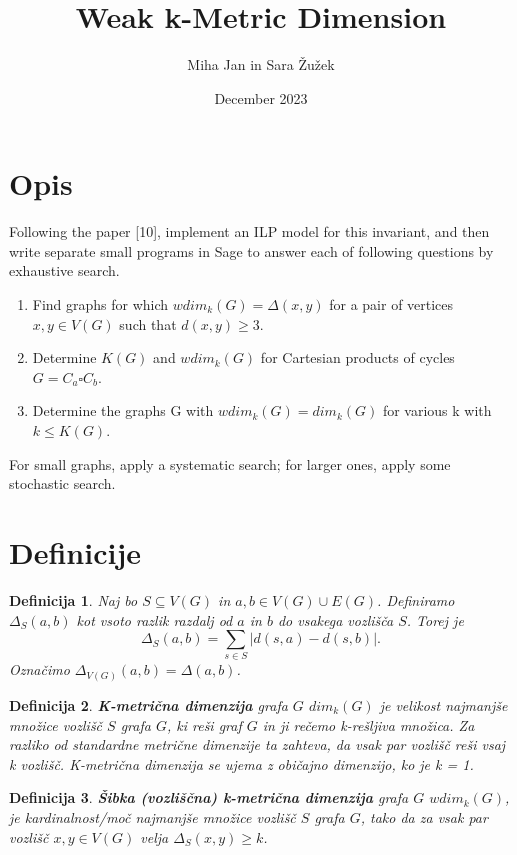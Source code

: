 \documentclass[a4paper,12pt]{article}
\newtheorem{definition}{Definicija}
\begin{document}
\author{Miha Jan in Sara Žužek}
\date{December 2023}
\title{Weak k-Metric Dimension}
\maketitle

\section{Opis}
Following the paper [10], implement an ILP model for this invariant, and then write separate
small programs in Sage to answer each of following questions by exhaustive search.
\begin{enumerate}
    \item Find graphs for which $wdim_k(G) = \Delta(x, y)$ for a pair of vertices $x, y \in V(G)$ such that
    $d(x, y) \geq 3$.
    \item Determine $K(G)$ and $wdim_k(G)$ for Cartesian products of cycles $G = C_a \square C_b$.
    \item  Determine the graphs G with $wdim_k(G) = dim_k(G)$ for various k with $k \leq K(G)$.
\end{enumerate}
For small graphs, apply a systematic search; for larger ones, apply some stochastic search.


\section{Definicije}
    \begin{definition}
       Naj bo $S \subseteq V(G)$ in $a, b \in V(G) \cup E(G)$. Definiramo $\Delta_S (a,b)$ kot vsoto razlik razdalj od $a$ in $b$ do vsakega vozlišča $S$. 
       Torej je $$\Delta_S (a,b) = \sum_{s \in S } |d(s,a) - d(s,b)|.$$
       Označimo $\Delta_{V(G)} (a,b) = \Delta (a,b)$.
    \end{definition}

    \begin{definition}
        {\bf K-metrična dimenzija} grafa $G$ $dim_k(G)$ je velikost najmanjše množice vozlišč $S$ grafa $G$, ki reši graf $G$ in ji rečemo k-rešljiva množica. 
        Za razliko od standardne metrične dimenzije ta zahteva, da vsak par vozlišč reši vsaj k vozlišč. K-metrična dimenzija se ujema z običajno dimenzijo, ko je k = 1.
    \end{definition}

    \begin{definition} 
        {\bf Šibka (vozliščna) k-metrična dimenzija} grafa $G$ $wdim_k(G)$, je kardinalnost/moč
        najmanjše množice vozlišč $S$ grafa $G$, tako da za vsak par vozlišč $x,y \in V(G)$ velja $\Delta_S (x,y) \geq k$.
    \end{definition}
\end{document}
